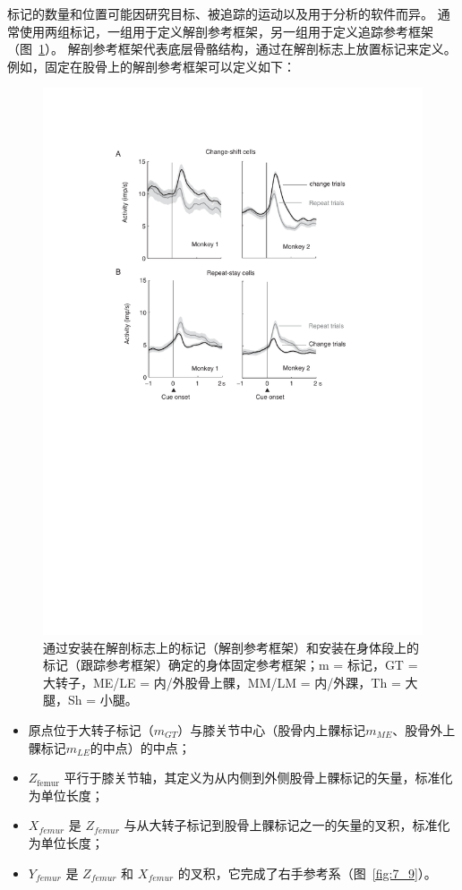 标记的数量和位置可能因研究目标、被追踪的运动以及用于分析的软件而异。
通常使用两组标记，一组用于定义解剖参考框架，另一组用于定义追踪参考框架（图~\ref{fig:7_11}）。
解剖参考框架代表底层骨骼结构，通过在解剖标志上放置标记来定义。
例如，固定在股骨上的解剖参考框架可以定义如下：


\begin{figure}[!htb]
	\centering
	\includegraphics[width=0.75\linewidth]{chap7/7_11}
	\caption{通过安装在解剖标志上的标记（解剖参考框架）和安装在身体段上的标记（跟踪参考框架）确定的身体固定参考框架；m = 标记，GT = 大转子，ME/LE = 内/外股骨上髁，MM/LM = 内/外踝，Th = 大腿，Sh = 小腿。 \label{fig:7_11}}
\end{figure}


\begin{itemize}
	\item 原点位于大转子标记（$m_{GT}$）与膝关节中心（股骨内上髁标记$m_{ME}$、股骨外上髁标记$m_{LE}$的中点）的中点；
	\item $Z_\text{femur}$ 平行于膝关节轴，其定义为从内侧到外侧股骨上髁标记的矢量，标准化为单位长度；
	\item $X_{femur}$ 是 $Z_{femur}$ 与从大转子标记到股骨上髁标记之一的矢量的叉积，标准化为单位长度；
	\item $Y_{femur}$ 是 $Z_{femur}$ 和 $X_{femur}$ 的叉积，它完成了右手参考系（图~\ref{fig:7_9}）。
\end{itemize}


